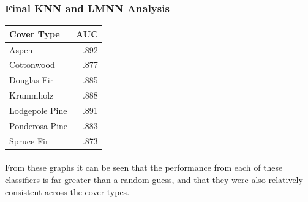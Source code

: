 \documentclass[11pt]{article}
\begin{document}
    \subsubsection{Final KNN and LMNN Analysis}
     
    \begin{center}
     \begin{tabular}{ l | r}
       \hline
       Cover Type & AUC \\ \hline
     
       Aspen & .892 \\ \hline
       Cottonwood & .877 \\ \hline
       Douglas Fir & .885 \\ \hline
       Krummholz & .888 \\ \hline
       Lodgepole Pine & .891 \\ \hline
       Ponderosa Pine & .883 \\ \hline
       Spruce Fir & .873 \\ \hline
     \end{tabular}
    \end{center}
    \paragraph{}
    From these graphs it can be seen that the performance from each of these classifiers is far greater than a random guess, and that they were also relatively consistent across the cover types.
\end{document}
